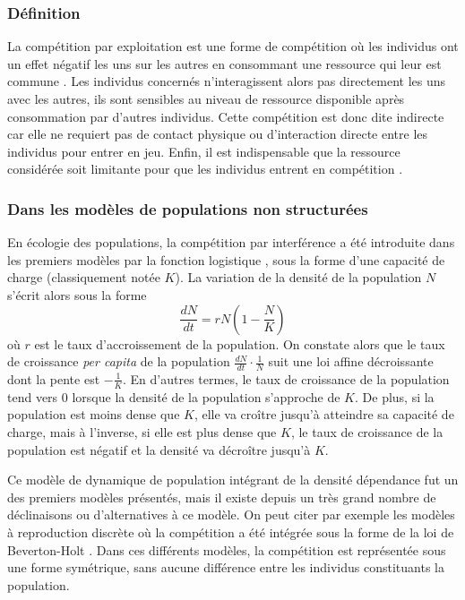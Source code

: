 \subsubsection{Définition}


La compétition par exploitation est une forme de compétition où les
individus ont un effet négatif les uns sur les autres en consommant une
ressource qui leur est commune \autocites{goss-custard1980a,
vance1984a, begon2009a}. Les individus concernés n'interagissent alors pas directement les
uns avec les autres, ils sont sensibles au niveau de ressource
disponible après consommation par d'autres individus. Cette compétition est
donc dite indirecte car elle ne requiert pas de contact physique ou
d'interaction directe entre les individus pour entrer en jeu. Enfin, il est
indispensable que la ressource considérée soit limitante pour que les individus
entrent en compétition \autocites{begon2009a}. 

\subsubsection{Dans les modèles de populations non structurées}

En écologie des populations, la compétition par interférence a été introduite 
dans les premiers modèles par la fonction logistique
\autocites{verhulst1838a}, sous la forme d'une capacité de charge (classiquement notée $K$). La variation
de la densité de la population $N$ s'écrit alors sous la forme
$$\frac{dN}{dt}=rN \left(1-\frac{N}{K}\right)$$ où $r$ est le taux
d'accroissement de la population. On constate alors que le taux de croissance
\textit{per capita} de la population $\frac{dN}{dt}\cdot \frac{1}{N}$ suit 
une loi affine décroissante dont la pente est $-\frac{1}{K}$. En d'autres termes, le
taux de croissance de la population tend vers 0 lorsque la densité de la
population s'approche de $K$. De plus, si la population est moins dense que $K$,
elle va croître jusqu'à atteindre sa capacité de charge, mais à l'inverse, si
elle est plus dense que $K$, le taux de croissance de la population est négatif
et la densité va décroître jusqu'à $K$.

Ce modèle de dynamique de population intégrant de la densité dépendance fut un
des premiers modèles présentés, mais il existe depuis un très grand nombre de
déclinaisons ou d'alternatives à ce modèle. On peut citer par exemple les
modèles à reproduction discrète où la compétition a été intégrée sous la forme
de la loi de Beverton-Holt \autocites{beverton1957a}. Dans ces différents
modèles, la compétition est représentée sous une forme symétrique, sans aucune différence entre les
individus constituants la population. 

